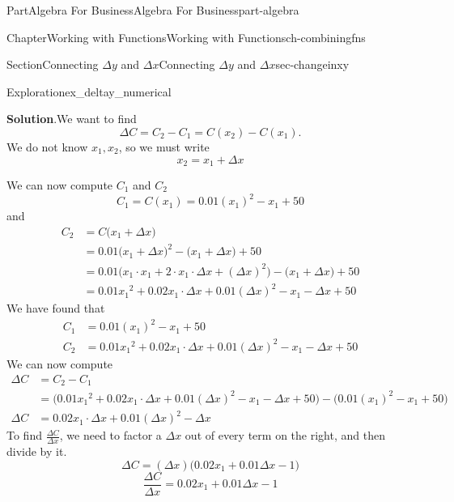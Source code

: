 \documentclass[oneside,10pt,]{tufte-book}
\newcommand{\blocktitlefont}{\relax}
\numberwithin{equation}{chapter}
\newcommand{\amp}{&}
\begin{document}
\begin{partptx}{Part}{Algebra For Business}{}{Algebra For Business}{}{}{part-algebra}
\begin{chapterptx}{Chapter}{Working with Functions}{}{Working with Functions}{}{}{ch-combiningfns}
\begin{sectionptx}{Section}{\textasteriskcentered{}Connecting \(\Delta y\) and \(\Delta x\)}{}{\textasteriskcentered{}Connecting \(\Delta y\) and \(\Delta x\)}{}{}{sec-changeinxy}
\begin{exploration}{Exploration}{}{ex_deltay_numerical}
\begin{enumerate}[font=\bfseries,label=(\alph*),ref=\alph*]
\par\smallskip%
\noindent\textbf{\blocktitlefont Solution}.\hypertarget{ex_deltay_numerical-7-2}{}\quad{}We want to find%
\begin{equation*}
\Delta C = C_2 - C_1 = C(x_2) - C(x_1)\text{.}
\end{equation*}
We do not know \(x_1,x_2\), so we must write%
\begin{equation*}
x_2 = x_1 + \Delta x
\end{equation*}
%
\par
We can now compute \(C_1\) and \(C_2\)%
\begin{equation*}
C_1 = C(x_1) = 0.01(x_1)^2 - x_1 + 50 
\end{equation*}
and%
\begin{align*}
C_2 \amp = C\Big(x_1 + \Delta x\Big)\\
\amp = 0.01\Big(x_1 + \Delta x\Big)^2 - \Big(x_1 + \Delta x\Big) + 50 \\
\amp = 0.01\Big(x_1\cdot x_1 + 2\cdot x_1\cdot \Delta x + (\Delta x)^2\Big) - \Big(x_1 + \Delta x\Big) + 50 \\
\amp = 0.01{x_1}^2 + 0.02x_1\cdot \Delta x + 0.01(\Delta x)^2 - x_1 - \Delta x + 50 
\end{align*}
We have found that%
\begin{align*}
C_1 \amp = 0.01(x_1)^2 - x_1 + 50\\
C_2 \amp = 0.01{x_1}^2 + 0.02x_1\cdot \Delta x + 0.01(\Delta x)^2 - x_1 - \Delta x + 50
\end{align*}
We can now compute%
\begin{align*}
\Delta C \amp = C_2 - C_1 \\
\amp = \Big(0.01{x_1}^2 + 0.02x_1\cdot \Delta x + 0.01(\Delta x)^2 - x_1 - \Delta x + 50   \Big) - \Big(0.01(x_1)^2 - x_1 + 50\Big)\\
\Delta C \amp = 0.02x_1\cdot \Delta x + 0.01(\Delta x)^2 - \Delta x   
\end{align*}
To find \(\frac{\Delta C}{\Delta x}\), we need to factor a \(\Delta x\) out of every term on the right, and then divide by it.%
\begin{equation*}
\Delta C  = (\Delta x) \Big( 0.02x_1 + 0.01 \Delta x - 1\Big)  
\end{equation*}
%
\begin{equation*}
\dfrac{\Delta C}{\Delta x}  =  0.02x_1 + 0.01 \Delta x - 1 
\end{equation*}
%
\end{enumerate}%
\end{exploration}%

\end{sectionptx}
\end{chapterptx}
\end{partptx}
\end{document}
